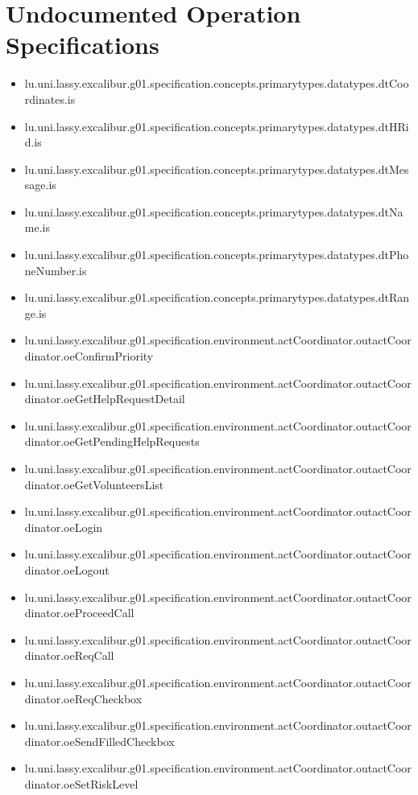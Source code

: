 \section[Undocumented Operation Specifications]{Undocumented Operation Specifications}
\begin{itemize}
\item lu.uni.lassy.excalibur.g01.specification.concepts.primarytypes.datatypes.dtCoordinates.is 
\item lu.uni.lassy.excalibur.g01.specification.concepts.primarytypes.datatypes.dtHRid.is 
\item lu.uni.lassy.excalibur.g01.specification.concepts.primarytypes.datatypes.dtMessage.is 
\item lu.uni.lassy.excalibur.g01.specification.concepts.primarytypes.datatypes.dtName.is 
\item lu.uni.lassy.excalibur.g01.specification.concepts.primarytypes.datatypes.dtPhoneNumber.is 
\item lu.uni.lassy.excalibur.g01.specification.concepts.primarytypes.datatypes.dtRange.is 
\item lu.uni.lassy.excalibur.g01.specification.environment.actCoordinator.outactCoordinator.oeConfirmPriority 
\item lu.uni.lassy.excalibur.g01.specification.environment.actCoordinator.outactCoordinator.oeGetHelpRequestDetail 
\item lu.uni.lassy.excalibur.g01.specification.environment.actCoordinator.outactCoordinator.oeGetPendingHelpRequests 
\item lu.uni.lassy.excalibur.g01.specification.environment.actCoordinator.outactCoordinator.oeGetVolunteersList 
\item lu.uni.lassy.excalibur.g01.specification.environment.actCoordinator.outactCoordinator.oeLogin 
\item lu.uni.lassy.excalibur.g01.specification.environment.actCoordinator.outactCoordinator.oeLogout 
\item lu.uni.lassy.excalibur.g01.specification.environment.actCoordinator.outactCoordinator.oeProceedCall 
\item lu.uni.lassy.excalibur.g01.specification.environment.actCoordinator.outactCoordinator.oeReqCall 
\item lu.uni.lassy.excalibur.g01.specification.environment.actCoordinator.outactCoordinator.oeReqCheckbox 
\item lu.uni.lassy.excalibur.g01.specification.environment.actCoordinator.outactCoordinator.oeSendFilledCheckbox 
\item lu.uni.lassy.excalibur.g01.specification.environment.actCoordinator.outactCoordinator.oeSetRiskLevel 

\end{itemize}
